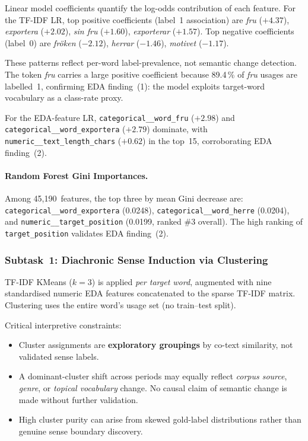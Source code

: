Linear model coefficients quantify the log-odds contribution of each feature.
For the TF-IDF LR, top positive coefficients (label~1 association) are
\emph{fru} ($+4.37$), \emph{exportera} ($+2.02$), \emph{sin fru} ($+1.60$),
\emph{exporterar} ($+1.57$).  Top negative coefficients (label~0) are
\emph{fr\"{o}ken} ($-2.12$), \emph{herrar} ($-1.46$), \emph{motivet}
($-1.17$).

These patterns reflect per-word label-prevalence, not semantic change
detection.  The token \emph{fru} carries a large positive coefficient
because 89.4\,\% of \emph{fru} usages are labelled~1, confirming EDA
finding~(1): the model exploits target-word vocabulary as a class-rate proxy.

For the EDA-feature LR, \texttt{categorical\_\_word\_fru} ($+2.98$) and
\texttt{categorical\_\_word\_exportera} ($+2.79$) dominate, with
\texttt{numeric\_\_text\_length\_chars} ($+0.62$) in the top~15,
corroborating EDA finding~(2).

\paragraph{Random Forest Gini Importances.}
Among 45,190~features, the top three by mean Gini decrease are:
\texttt{categorical\_\_word\_exportera} (0.0248),
\texttt{categorical\_\_word\_herre} (0.0204), and
\texttt{numeric\_\_target\_position} (0.0199, ranked \#3 overall).
The high ranking of \texttt{target\_position} validates EDA finding~(2).

\subsubsection{Subtask~1: Diachronic Sense Induction via Clustering}

TF-IDF KMeans ($k=3$) is applied \emph{per target word}, augmented with
nine standardised numeric EDA features concatenated to the sparse TF-IDF
matrix.  Clustering uses the entire word's usage set (no train--test split).

Critical interpretive constraints:
\begin{itemize}
  \item Cluster assignments are \textbf{exploratory groupings} by co-text
    similarity, not validated sense labels.
  \item A dominant-cluster shift across periods may equally reflect
    \emph{corpus source}, \emph{genre}, or \emph{topical vocabulary} change.
    No causal claim of semantic change is made without further validation.
  \item High cluster purity can arise from skewed gold-label distributions
    rather than genuine sense boundary discovery.
\end{itemize}


